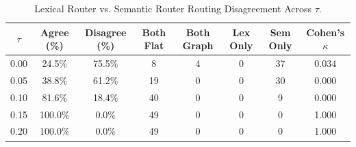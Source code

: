 \begin{table}[t]
\centering
\small
\caption{Lexical Router vs. Semantic Router Routing Disagreement Across $\tau$.}
\label{tab:router_disagreement}
\begin{tabular}{cccccccc}
\toprule
\textbf{$\tau$} & \textbf{Agree (\%)} & \textbf{Disagree (\%)} & \textbf{Both Flat} & \textbf{Both Graph} & \textbf{Lex Only} & \textbf{Sem Only} & \textbf{Cohen's $\kappa$} \\
\midrule
0.00 &  24.5\% &  75.5\% & 8 & 4 & 0 & 37 & 0.034 \\
0.05 &  38.8\% &  61.2\% & 19 & 0 & 0 & 30 & 0.000 \\
0.10 &  81.6\% &  18.4\% & 40 & 0 & 0 & 9 & 0.000 \\
0.15 & 100.0\% &   0.0\% & 49 & 0 & 0 & 0 & 1.000 \\
0.20 & 100.0\% &   0.0\% & 49 & 0 & 0 & 0 & 1.000 \\
\bottomrule
\end{tabular}
\end{table}